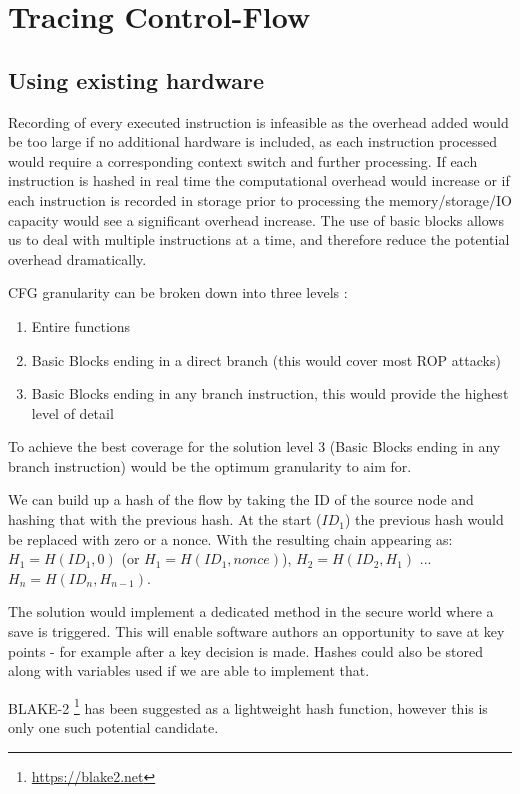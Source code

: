 \section{Tracing Control-Flow}

\subsection{Using existing hardware}

Recording of every executed instruction is infeasible as the overhead added would be too large if no additional hardware is included, as each instruction processed would require a corresponding context switch and further processing. If each instruction is hashed in real time the computational overhead would increase or if each instruction is recorded in storage prior to processing the memory\slash storage\slash IO capacity would see a significant overhead increase. The use of basic blocks allows us to deal with multiple instructions at a time, and therefore reduce the potential overhead dramatically.

CFG granularity can be broken down into three levels \cite{Abera2016}:
\begin{enumerate}
	\item{Entire functions}
	\item{Basic Blocks ending in a direct branch (this would cover most ROP attacks)}
	\item{Basic Blocks ending in any branch instruction, this would provide the highest level of detail}
\end{enumerate}

To achieve the best coverage for the solution level 3 (Basic Blocks ending in any branch instruction) would be the optimum granularity to aim for.

We can build up a hash of the flow by taking the ID of the source node and hashing that with the previous hash. At the start ($ID_1$) the previous hash would be replaced with zero or a nonce. With the resulting chain appearing as: 
$H_1 = H(ID_1,0)$ (or $H_1 = H(ID_1,nonce)$), $H_2 = H(ID_2,H_1)$ ... $H_n = H(ID_n,H_{n-1})$.

The solution would implement a dedicated method in the secure world where a save is triggered. This will enable software authors an opportunity to save at key points - for example after a key decision is made. Hashes could also be stored along with variables used if we are able to implement that.

BLAKE-2 \footnote{\url{https://blake2.net}} has been suggested as a lightweight hash function, however this is only one such potential candidate.

